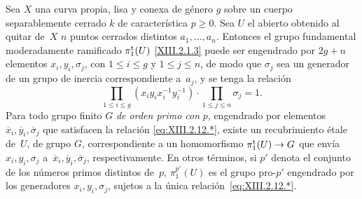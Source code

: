 
\begingroup
\setcounter{proposition}{11}%
\begin{corollaire}
\label{XIII.2.12}
Sea $X$ una curva propia, lisa y conexa de género $g$ sobre un cuerpo
separablemente cerrado $k$ de característica $p\geq 0$. Sea $U$ el abierto
obtenido al quitar de~$X$ $n$ puntos cerrados distintos
$a_1,\dots,a_n$. Entonces el grupo fundamental moderadamente ramificado
$\pi_1^{\mathrm{t}}(U)$ \eqref{XIII.2.1.3} puede ser engendrado por $2g+n$
elementos $x_i,y_i,\sigma_j$, con $1\leq i\leq g$ y
$1\leq j\leq n$, de modo que $\sigma_j$ sea un generador de un grupo
de inercia correspondiente a~$a_j$, y se tenga la relación
\begin{equation*}
\label{eq:XIII.2.12.*}
\tag{$*$} \prod_{1\leq i\leq
g}(x_iy_ix^{-1}_iy^{-1}_i)\cdot\prod_{1\leq j\leq n}\sigma_j=1.
\end{equation*}
Para todo grupo finito $G$ \emph{de orden primo con} $p$,
engendrado por elementos $\overline{x}_i,\overline{y}_i,
\overline{\sigma}_j$ que satisfacen la relación
\eqref{eq:XIII.2.12.*}, existe un recubrimiento étale de~$U$, de grupo
$G$, correspondiente a un homomorfismo $\pi_1^{\mathrm{t}}(U)\to G$ que
%
envía $x_i,y_i,\sigma_j$ a~$\overline{x}_i,\overline{y}_i,
\overline{\sigma}_j$, respectivamente. En otros términos, si $p'$ denota
el conjunto de los números primos distintos de~$p$, $\pi_1^{p'}(U)$ es el
grupo pro-$p'$ engendrado por los generadores $x_i,y_i,\sigma_j$, sujetos
a la única relación~\eqref{eq:XIII.2.12.*}.
\end{corollaire}

